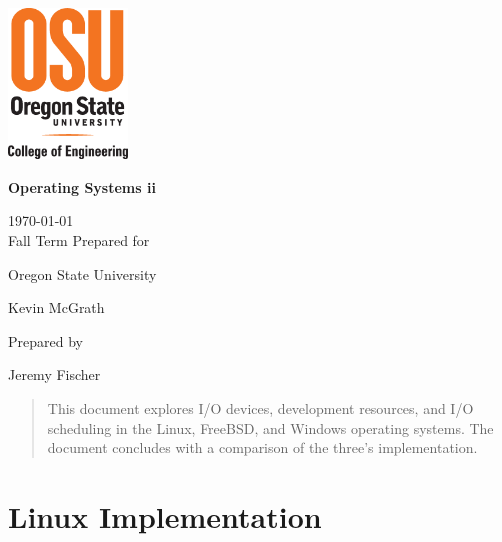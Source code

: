 \documentclass[onecolumn,draftclsnofoot, 10pt, compsoc]{IEEEtran}
\def \GroupNumber{		17}
\def \Jeremy{			Jeremy Fischer}
\def \Class{		Operating Systems ii}
\def \School{	Oregon State University}
\def \Professor{		 Kevin McGrath}
\begin{document}
\begin{titlepage}
    \begin{singlespace}
    \includegraphics[height=4cm]{coe.eps}
        \hfill  
        \par\vspace{.2in}
        \centering
        \scshape{
            \vspace{.5in}
            \textbf{\Huge\Class}\par
            \large{
            	\today \\Fall Term
        	}
            \vfill
            {\large Prepared for}\par
            \huge \School\par
            \vspace{5pt}
            {\Large{\Professor}\par}
            {\large Prepared by }\par
            \vspace{5pt}
            {\Large
                {\Jeremy}\par
            }
            \vspace{20pt}
        }
        \begin{abstract}
        	This document explores I/O devices, development resources, and I/O scheduling in the Linux, FreeBSD, and Windows operating systems. 
        	The document concludes with a comparison of the three's implementation.
        \end{abstract}     
    \end{singlespace}
\end{titlepage}
\newpage
{}
\tableofcontents
\clearpage









\section{Linux Implementation}
\end{document}
